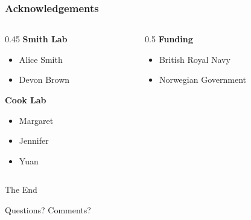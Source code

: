 \documentclass[
	11pt, %
]{beamer}
\begin{document}

\begin{frame}
	\frametitle{Acknowledgements}
	
	\begin{columns}[t] %
		\begin{column}{0.45\textwidth} %
			\textbf{Smith Lab}
			\begin{itemize}
				\item Alice Smith
				\item Devon Brown
			\end{itemize}
			\textbf{Cook Lab}
			\begin{itemize}
				\item Margaret
				\item Jennifer
				\item Yuan
			\end{itemize}
		\end{column}		
		\begin{column}{0.5\textwidth} %
			\textbf{Funding}
			\begin{itemize}
				\item British Royal Navy
				\item Norwegian Government
			\end{itemize}
		\end{column}
	\end{columns}
\end{frame}


\begin{frame}[plain] %
	\begin{center}
		{\Huge The End}
		
		\bigskip\bigskip %
		
		{\LARGE Questions? Comments?}
	\end{center}
\end{frame}

\end{document}
